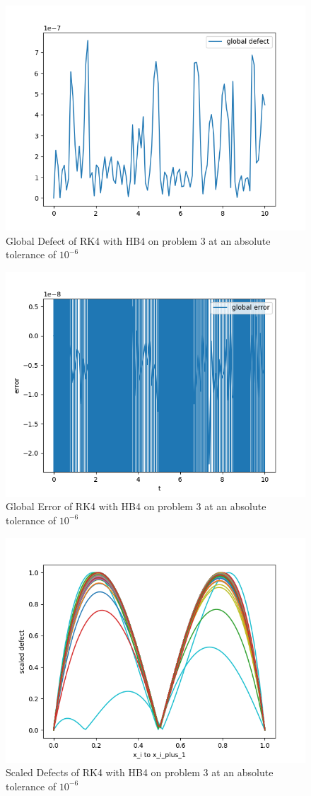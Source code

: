 \documentclass{article}
\begin{document}
\begin{figure}[H]
\centering
\includegraphics[width=0.7\linewidth]{./figures/rk4_with_hb4_p3_global_defect}
\caption{Global Defect of RK4 with HB4 on problem 3 at an absolute tolerance of $10^{-6}$}
\label{fig:rk4_with_hb4_p3_global_defect}
\end{figure}

\begin{figure}[H]
\centering
\includegraphics[width=0.7\linewidth]{./figures/rk4_with_hb4_p3_global_error}
\caption{Global Error of RK4 with HB4 on problem 3 at an absolute tolerance of $10^{-6}$}
\label{fig:rk4_with_hb4_p3_global_error}
\end{figure}

\begin{figure}[H]
\centering
\includegraphics[width=0.7\linewidth]{./figures/rk4_with_hb4_p3_scaled_defects}
\caption{Scaled Defects of RK4 with HB4 on problem 3 at an absolute tolerance of $10^{-6}$}
\label{fig:rk4_with_hb4_p3_scaled_defects}
\end{figure}
\end{document}
